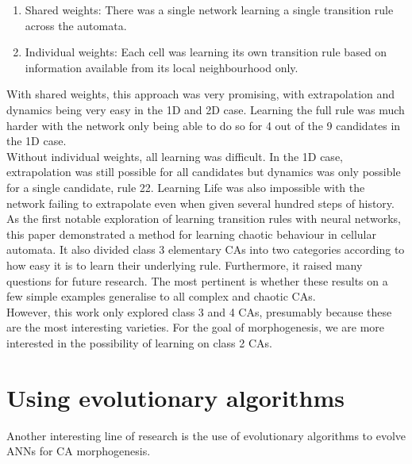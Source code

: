 \begin{enumerate}
  \item Shared weights: There was a single network learning a single transition rule across the automata.
  \item Individual weights: Each cell was learning its own transition rule based on information available from its local neighbourhood only.
\end{enumerate}

With shared weights, this approach was very promising, with extrapolation and dynamics being very easy in the 1D and 2D case.
Learning the full rule was much harder with the network only being able to do so for 4 out of the 9 candidates in the 1D case. \\ 

Without individual weights, all learning was difficult. 
In the 1D case, extrapolation was still possible for all candidates but dynamics was only possible for a single candidate, rule 22. 
Learning Life was also impossible with the network failing to extrapolate even when given several hundred steps of history.\\ 

As the first notable exploration of learning transition rules with neural networks, this paper demonstrated a method for learning chaotic behaviour in cellular automata.
It also divided class 3 elementary CAs into two categories according to how easy it is to learn their underlying rule.
Furthermore, it raised many questions for future research.
The most pertinent is whether these results on a few simple examples generalise to all complex and chaotic CAs.\\

However, this work only explored class 3 and 4 CAs, presumably because these are the most interesting varieties.
For the goal of morphogenesis, we are more interested in the possibility of learning on class 2 CAs.

\section{Using evolutionary algorithms}
Another interesting line of research is the use of evolutionary algorithms to evolve ANNs for CA morphogenesis.\\

